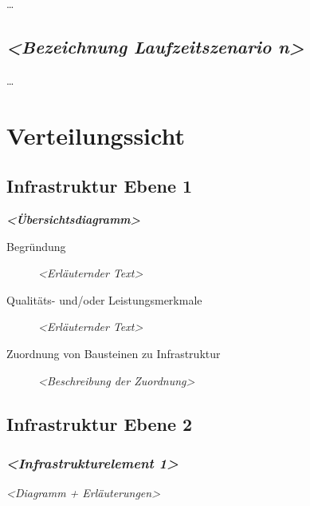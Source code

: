 \documentclass[
]{article}
\begin{document}
\ldots{}

\hypertarget{__emphasis_bezeichnung_laufzeitszenario_n_emphasis}{%
\subsection{\texorpdfstring{\emph{\textless Bezeichnung Laufzeitszenario
n\textgreater{}}}{\textless Bezeichnung Laufzeitszenario n\textgreater{}}}\label{__emphasis_bezeichnung_laufzeitszenario_n_emphasis}}

\ldots{}

\hypertarget{section-deployment-view}{%
\section{Verteilungssicht}\label{section-deployment-view}}

\hypertarget{_infrastruktur_ebene_1}{%
\subsection{Infrastruktur Ebene 1}\label{_infrastruktur_ebene_1}}

\emph{\textbf{\textless Übersichtsdiagramm\textgreater{}}}

\begin{description}
\item[Begründung]
\emph{\textless Erläuternder Text\textgreater{}}
\item[Qualitäts- und/oder Leistungsmerkmale]
\emph{\textless Erläuternder Text\textgreater{}}
\item[Zuordnung von Bausteinen zu Infrastruktur]
\emph{\textless Beschreibung der Zuordnung\textgreater{}}
\end{description}

\hypertarget{_infrastruktur_ebene_2}{%
\subsection{Infrastruktur Ebene 2}\label{_infrastruktur_ebene_2}}

\hypertarget{__emphasis_infrastrukturelement_1_emphasis}{%
\subsubsection{\texorpdfstring{\emph{\textless Infrastrukturelement
1\textgreater{}}}{\textless Infrastrukturelement 1\textgreater{}}}\label{__emphasis_infrastrukturelement_1_emphasis}}

\emph{\textless Diagramm + Erläuterungen\textgreater{}}
\end{document}
